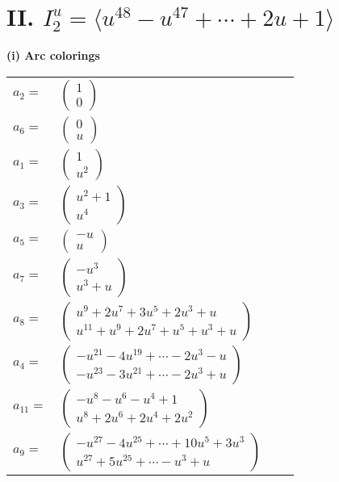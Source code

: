 \documentclass[1p]{elsarticle_modified}
\theoremstyle{definition}
\begin{document}
\centering \section*{II. $I^u_{2}= \langle u^{48}- u^{47}+\cdots+2 u+1 \rangle$}
\flushleft \textbf{(i) Arc colorings}\\
\begin{tabular}{m{7pt} m{180pt} m{7pt} m{180pt} }
\flushright $a_{2}=$&$\begin{pmatrix}1\\0\end{pmatrix}$ \\
\flushright $a_{6}=$&$\begin{pmatrix}0\\u\end{pmatrix}$ \\
\flushright $a_{1}=$&$\begin{pmatrix}1\\u^2\end{pmatrix}$ \\
\flushright $a_{3}=$&$\begin{pmatrix}u^2+1\\u^4\end{pmatrix}$ \\
\flushright $a_{5}=$&$\begin{pmatrix}- u\\u\end{pmatrix}$ \\
\flushright $a_{7}=$&$\begin{pmatrix}- u^3\\u^3+u\end{pmatrix}$ \\
\flushright $a_{8}=$&$\begin{pmatrix}u^9+2 u^7+3 u^5+2 u^3+u\\u^{11}+u^9+2 u^7+u^5+u^3+u\end{pmatrix}$ \\
\flushright $a_{4}=$&$\begin{pmatrix}- u^{21}-4 u^{19}+\cdots-2 u^3- u\\- u^{23}-3 u^{21}+\cdots-2 u^3+u\end{pmatrix}$ \\
\flushright $a_{11}=$&$\begin{pmatrix}- u^8- u^6- u^4+1\\u^8+2 u^6+2 u^4+2 u^2\end{pmatrix}$ \\
\flushright $a_{9}=$&$\begin{pmatrix}- u^{27}-4 u^{25}+\cdots+10 u^5+3 u^3\\u^{27}+5 u^{25}+\cdots- u^3+u\end{pmatrix}$ \\

\end{tabular}
\end{document}
